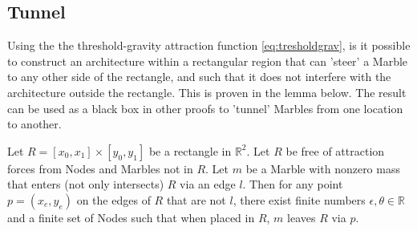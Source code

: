 \subsection{Tunnel}

Using the the threshold-gravity attraction function \eqref{eq:tresholdgrav}, is it possible to construct an architecture within a rectangular region that can 'steer' a Marble to any other side of the rectangle, and such that it does not interfere with the architecture outside the rectangle. This is proven in the lemma below. The result can be used as a black box in other proofs to 'tunnel' Marbles from one location to another.

\begin{lemma}[Tunnel] \label{lemma:tunnel}
    Let $R = [x_0, x_1] \times [y_0, y_1]$ be a rectangle in $\mathbb{R}^2$. Let $R$ be free of attraction forces from Nodes and Marbles not in $R$. Let $m$ be a Marble with nonzero mass that enters (not only intersects) $R$ via an edge $l$. Then for any point $p = (x_e, y_e)$ on the edges of $R$ that are not $l$, there exist finite numbers $\epsilon, \theta \in \mathbb{R}$ and a finite set of Nodes such that when placed in $R$, $m$ leaves $R$ via $p$.
\end{lemma}
